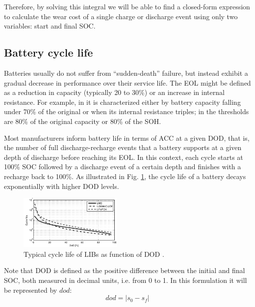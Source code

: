 \documentclass{ieeeaccess}
\begin{document}
	Therefore, by solving this integral we will be able to find a closed-form expression to calculate the wear cost of a single charge or discharge event using only two variables: start and final \ac{SOC}.

    \subsection{Battery cycle life}
    Batteries usually do not suffer from ``sudden-death'' failure, but instead exhibit a gradual decrease in performance over their service life. The \ac{EOL} might be defined as a reduction in capacity (typically 20 to 30\%) or an increase in internal resistance. For example, in \cite{ECKER2014} it is characterized either by battery capacity falling under 70\% of the original or when its internal resistance triples; in \cite{NARAYAN2018} the thresholds are 80\% of the original capacity or 80\% of the \ac{SOH}.

    Most manufacturers inform battery life in terms of \ac{ACC} at a given \ac{DOD}, that is, the number of full discharge-recharge events that a battery supports at a given depth of discharge before reaching its \ac{EOL}. In this context, each cycle starts at 100\% \ac{SOC} followed by a discharge event of a certain depth and finishes with a recharge back to 100\%. As illustrated in Fig. \ref{fig:acc_curves1}, the cycle life of a battery decays exponentially with higher \ac{DOD} levels.
    \begin{figure}[htbp]
        \centering
        \includegraphics[width=0.45\textwidth]{figures/acc_curves1.png}
        \caption{Typical cycle life of \acp{LIB} as function of \ac{DOD} \cite{XU2016}.}
        \label{fig:acc_curves1}
    \end{figure}

    Note that \ac{DOD} is defined as the positive difference between the initial and final \ac{SOC}, both measured in decimal units, i.e. from 0 to 1. In this formulation it will be represented by $dod$:
        $$ dod = |s_{0}-s_{f}|$$
\end{document}
